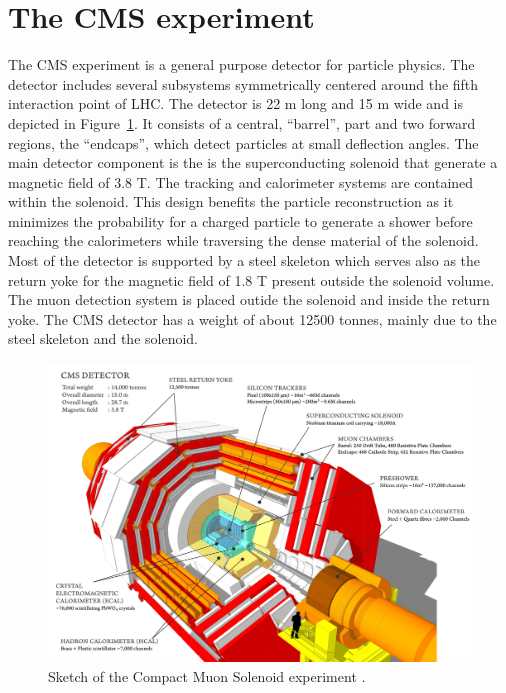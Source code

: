 \section{The CMS experiment}

The CMS experiment is a general purpose detector for particle physics. The detector
includes several subsystems symmetrically centered around
the fifth interaction point of LHC. The detector is 22 m long and 15 m wide and is depicted in Figure~\ref{fig:CMS}.
It consists of a central, ``barrel'', part and two forward regions, the ``endcaps'', which
detect particles at small deflection angles.
The main detector component is the is the
superconducting solenoid that generate a magnetic field of 3.8 T. The tracking and calorimeter
systems are contained within the solenoid. This design benefits
the particle reconstruction as it minimizes the probability for a charged particle to
generate a shower before reaching the calorimeters while traversing the dense material of
the solenoid. Most of the detector is supported by
a steel skeleton which serves also as the return yoke for the magnetic field of 1.8 T
present outside the solenoid volume.
The muon detection system is placed outide the solenoid and inside the return yoke. The CMS detector has a weight
of about 12500 tonnes, mainly due to the steel skeleton and the solenoid.

\begin{figure}[!h]
  \includegraphics[width = 1.\textwidth]{figures/cms/cms_layout.png}
  \caption{Sketch of the Compact Muon Solenoid experiment \cite{cms_sketch}.}
  \label{fig:CMS}  
\end{figure}


